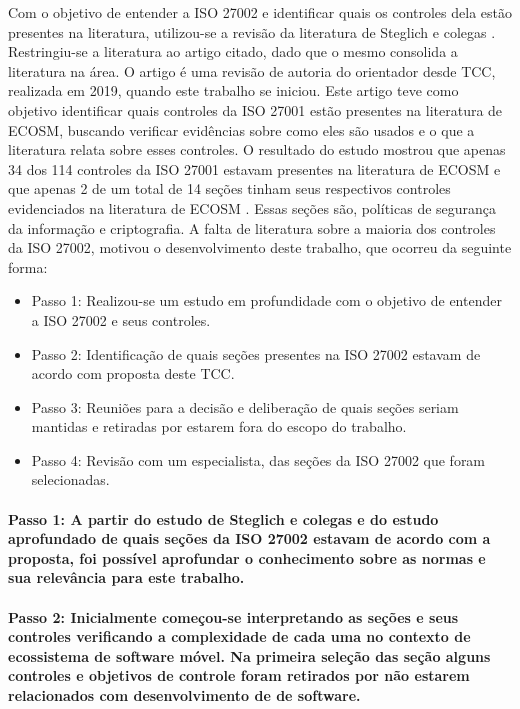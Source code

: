  Com o objetivo de entender a  ISO 27002 e identificar quais os controles dela estão presentes na literatura,
 utilizou-se a revisão da literatura de Steglich e colegas \cite{caio2019}. Restringiu-se a literatura ao artigo citado, dado que o mesmo consolida a literatura na área. O artigo é uma revisão de autoria do orientador desde TCC, realizada em 2019, quando este trabalho se iniciou. Este artigo teve como objetivo identificar quais controles da ISO 27001 estão presentes na literatura de ECOSM, buscando verificar evidências sobre como eles são usados e o que a literatura relata sobre esses controles. O resultado do estudo mostrou que apenas 34 dos 114 controles da ISO 27001 estavam presentes na literatura de ECOSM e que apenas 2 de um total de 14 seções tinham seus respectivos controles evidenciados na literatura de ECOSM . Essas seções são, políticas de segurança da informação e criptografia. A falta de literatura sobre a maioria dos controles da ISO 27002, motivou o desenvolvimento deste trabalho, que ocorreu da seguinte forma:
 
 \begin{itemize}
    \item Passo 1: Realizou-se um estudo em profundidade com o objetivo de entender a ISO 27002 e seus controles.
   
    \item Passo 2: Identificação de quais seções presentes na ISO 27002 estavam de acordo com proposta deste TCC.
    
     \item Passo 3: Reuniões para a decisão e deliberação de quais seções seriam mantidas e retiradas por estarem fora do escopo do trabalho.
      
    \item Passo 4: Revisão com um especialista, das seções da ISO 27002 que foram selecionadas.
  \end{itemize}

 
 \noindent \paragraph{\textbf{Passo 1:} A partir do estudo de Steglich e colegas \cite{caio2019} e do estudo aprofundado de quais seções da ISO 27002 estavam de acordo com a proposta, foi possível aprofundar o conhecimento sobre as normas e sua relevância para este trabalho.}
 
 \noindent \paragraph{\textbf{Passo 2:} Inicialmente começou-se interpretando as seções e seus controles verificando a complexidade de cada uma no contexto de ecossistema de software móvel. Na primeira seleção das seção alguns controles e objetivos de controle foram retirados por não estarem relacionados com desenvolvimento de de software.}
 
